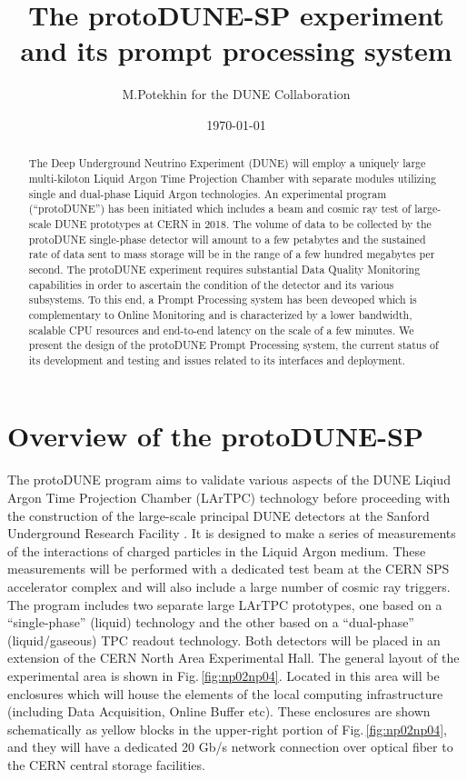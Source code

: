 \documentclass[pdftex,12pt,letter]{article}
\title{The protoDUNE-SP experiment and its prompt processing system}
\date{\today}
\author{M.Potekhin for the DUNE Collaboration}
\newcommand{\pd}{protoDUNE\xspace}
\begin{document}

\maketitle

\begin{abstract}


\noindent The Deep Underground Neutrino Experiment (DUNE) will employ a uniquely large multi-kiloton
Liquid Argon Time Projection Chamber with separate modules utilizing
single and dual-phase Liquid Argon technologies. An experimental 
program (``protoDUNE'')  has been initiated which includes a beam and cosmic ray test of large-scale DUNE prototypes at CERN in 2018.
The volume of data to be collected by the protoDUNE single-phase detector will amount to a few petabytes
and the sustained rate of data sent to mass storage will be in the range of a few hundred megabytes per second.
The protoDUNE experiment requires substantial Data Quality Monitoring capabilities in order to ascertain the
condition of the detector and its various subsystems. To this end, a Prompt Processing system has been deveoped
which is complementary to Online Monitoring and is characterized by a lower bandwidth, scalable CPU resources
and end-to-end latency on the scale of a few minutes. We present the design of the protoDUNE Prompt Processing
system, the current status of its development and testing and issues related to its interfaces and deployment.


\end{abstract}


\section{Overview of the protoDUNE-SP}
The \pd program aims to validate various aspects of the DUNE  Liqiud Argon Time Projection Chamber (LArTPC)  technology 
before proceeding with the construction of the large-scale principal DUNE detectors at the Sanford Underground Research
Facility \cite{cdrVol1, cdrVol4}. It  is designed to make a series of measurements of the interactions of
charged particles in the Liquid Argon medium.  These measurements will be performed with a dedicated test
beam  at the CERN SPS accelerator complex and will also include
a large number of cosmic ray triggers. The program includes two separate
large LArTPC prototypes, one based on a ``single-phase'' (liquid) technology and
the other based on a ``dual-phase'' (liquid/gaseous) TPC readout technology.
Both detectors will be placed in an extension of the CERN North Area Experimental Hall.
The general layout of the experimental area is shown in Fig.\,\ref{fig:np02np04}.
Located in this  area will be enclosures which will house the elements of the local computing infrastructure
(including Data Acquisition, Online Buffer etc). These enclosures are shown schematically as yellow blocks in the
upper-right portion of Fig.\,\ref{fig:np02np04}, and they will have a dedicated 20 Gb/s
network connection over optical fiber to the CERN central storage facilities.
\end{document}
